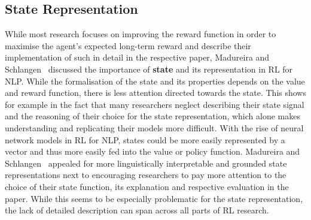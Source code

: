 \documentclass[11pt]{article}
\begin{document}
\subsection{State Representation}\label{state}
While most research focuses on improving the reward function in order to maximise the agent's expected long-term reward and describe their implementation of such in detail in the respective paper, Madureira and Schlangen~ discussed the importance of \textbf{state} and its representation in RL for NLP. While the formalisation of the state and its properties depends on the value and reward function, there is less attention directed towards the state. This shows for example in the fact that many researchers neglect describing their state signal and the reasoning of their choice for the state representation, which alone makes understanding and replicating their models more difficult. With the rise of neural network models in RL for NLP, states could be more easily represented by a vector and thus more easily fed into the value or policy function. Madureira and Schlangen~ appealed for more linguistically interpretable and grounded state representations next to encouraging researchers to pay more attention to the choice of their state function, its explanation and respective evaluation in the paper. While this seems to be especially problematic for the state representation, the lack of detailed description can span across all parts of RL research.
\end{document}
